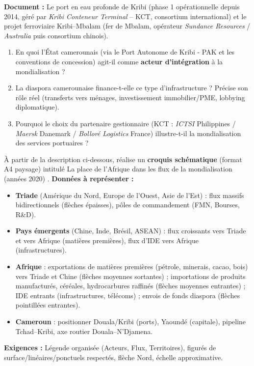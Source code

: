 \documentclass[11pt]{article}
\begin{document}
\begin{exercice}
\textbf{Document :} Le port en eau profonde de Kribi (phase 1 opérationnelle depuis 2014, géré par \emph{Kribi Conteneur Terminal} -- KCT, consortium international) et le projet ferroviaire Kribi--Mbalam (fer de Mbalam, opérateur \emph{Sundance Resources} / \emph{Australia} puis consortium chinois).
\begin{enumerate}
    \item En quoi l'État camerounais (via le Port Autonome de Kribi - PAK et les conventions de concession) agit-il comme \textbf{acteur d'intégration} à la mondialisation ?
    \item La diaspora camerounaise finance-t-elle ce type d'infrastructure ? Précise son rôle réel (transferts vers ménages, investissement immobilier/PME, lobbying diplomatique).
    \item Pourquoi le choix du partenaire gestionnaire (KCT : \emph{ICTSI} Philippines / \emph{Maersk} Danemark / \emph{Bolloré Logistics} France) illustre-t-il la mondialisation des services portuaires ?
\end{enumerate}
\end{exercice}

\begin{exercice}
À partir de la description ci-dessous, réalise un \textbf{croquis schématique} (format A4 paysage) intitulé \og La place de l'Afrique dans les flux de la mondialisation (années 2020) \fg.
\textbf{Données à représenter :}
\begin{itemize}
    \item \textbf{Triade} (Amérique du Nord, Europe de l'Ouest, Asie de l'Est) : flux massifs bidirectionnels (flèches épaisses), pôles de commandement (FMN, Bourses, R\&D).
    \item \textbf{Pays émergents} (Chine, Inde, Brésil, ASEAN) : flux croissants vers Triade et vers Afrique (matières premières), flux d'IDE vers Afrique (infrastructures).
    \item \textbf{Afrique} : exportations de matières premières (pétrole, minerais, cacao, bois) vers Triade et Chine (flèches moyennes sortantes) ; importations de produits manufacturés, céréales, hydrocarbures raffinés (flèches moyennes entrantes) ; IDE entrants (infrastructures, télécoms) ; envois de fonds diaspora (flèches pointillées entrantes).
    \item \textbf{Cameroun} : positionner Douala/Kribi (ports), Yaoundé (capitale), pipeline Tchad--Kribi, axe routier Douala--N'Djamena.
\end{itemize}
\textbf{Exigences :} Légende organisée (Acteurs, Flux, Territoires), figurés de surface/linéaires/ponctuels respectés, flèche Nord, échelle approximative.
\end{exercice}
\end{document}
